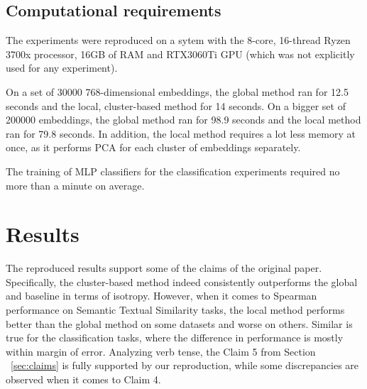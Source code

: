 \subsection{Computational requirements}

The experiments were reproduced on a sytem with the 8-core, 16-thread Ryzen 3700x processor, 16GB of RAM and RTX3060Ti GPU (which was not explicitly used for any experiment). 

On a set of 30000 768-dimensional embeddings, the global method ran for 12.5 seconds and the local, cluster-based method for 14 seconds. On a bigger set of 200000 embeddings, the global method ran for 98.9 seconds and the local method ran for 79.8 seconds. In addition, the local method requires a lot less memory at once, as it performs PCA for each cluster of embeddings separately.

The training of MLP classifiers for the classification experiments required no more than a minute on average. 

\section{Results}
\label{sec:results}
The reproduced results support some of the claims of the original paper. Specifically, the cluster-based method indeed consistently outperforms the global and baseline in terms of isotropy. However, when it comes to Spearman performance on Semantic Textual Similarity tasks, the local method performs better than the global method on some datasets and worse on others. Similar is true for the classification tasks, where the difference in performance is mostly within margin of error. Analyzing verb tense, the Claim 5 from Section ~\ref{sec:claims} is fully supported by our reproduction, while some discrepancies are observed when it comes to Claim 4.


